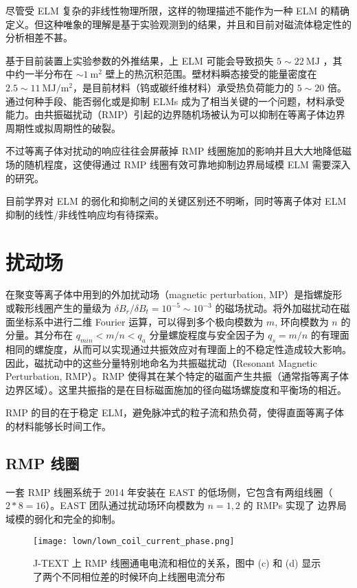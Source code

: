 尽管受 ELM 复杂的非线性物理所限，这样的物理描述不能作为一种 ELM 的精确定义。但这种唯象的理解是基于实验观测到的结果，并且和目前对磁流体稳定性的分析相差不甚。



\cite{2003PPCF...45.1549L} 基于目前装置上实验参数的外推结果，\iter 上 \typeone ELM 可能会导致损失 $5\sim \SI{22}{\mega\joule}$ ，其中约一半分布在 $\sim \SI{1}{\meter^2}$ 壁上的热沉积范围。壁材料瞬态接受的能量密度在 $2.5\sim \SI{11}{\mega\joule/\meter^2}$，是目前材料（钨或碳纤维材料）承受热负荷能力的 $5\sim 20$ 倍。通过何种手段、能否弱化或是抑制 ELMs 成为了相当关键的一个问题，材料承受能力。由共振磁扰动（RMP）引起的边界随机场被认为可以抑制在等离子体边界周期性或拟周期性的破裂。


不过等离子体对扰动的响应往往会屏蔽掉 RMP 线圈施加的影响并且大大地降低磁场的随机程度，这使得通过 RMP 线圈有效可靠地抑制边界局域模 ELM 需要深入的研究。

目前学界对 ELM 的弱化和抑制之间的关键区别还不明晰，同时等离子体对 ELM 抑制的线性/非线性响应均有待探索。

\section{扰动场}

在聚变等离子体中用到的外加扰动场（magnetic perturbation, MP）是指螺旋形或鞍形线圈产生的量级为 $\delta B_r/\delta B_t=10^{-5}\sim 10^{-3}$ 的磁场扰动。将外加磁扰动在磁面坐标系中进行二维 Fourier 运算，可以得到多个极向模数为 $m$, 环向模数为 $n$ 的分量。其分布在 $q_{min}<m/n<q_a$ 分量螺旋程度与安全因子为 $q_s=m/n$ 的有理面相同的螺旋度，从而可以实现通过共振效应对有理面上的不稳定性造成较大影响。因此，磁扰动中的这些分量特别地命名为共振磁扰动（Resonant Magnetic Perturbation, RMP）。RMP 使得其在某个特定的磁面产生共振（通常指等离子体边界区域）。这里共振指的是在目标磁面施加的径向磁场螺旋度和平衡场的相近。

RMP 的目的在于稳定 ELM，避免脉冲式的粒子流和热负荷，使得直面等离子体的材料能够长时间工作。


\subsection{RMP 线圈}
一套 RMP 线圈系统于 2014 年安装在 EAST 的低场侧，它包含有两组线圈（$2*8=16$）。EAST 团队通过扰动场环向模数为 $n=1, 2$ 的 RMPs 实现了 \typeone 边界局域模的弱化和完全的抑制。

  
\begin{figure}[htbp]
  \centering%
      \texttt{[image: lown/lown\_coil\_current\_phase.png]}
      \caption{J-TEXT 上 RMP 线圈通电电流和相位的关系，图中 (c) 和 (d) 显示了两个不同相位差的时候环向上线圈电流分布}
      \label{fig:lown_current}
\end{figure}


